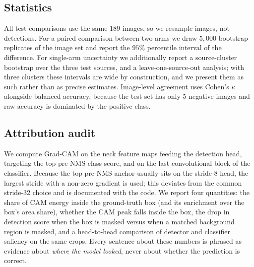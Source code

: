 \subsection{Statistics}

All test comparisons use the same $189$ images, so we resample images, not
detections. For a paired comparison between two arms we draw $5{,}000$ bootstrap
replicates of the image set \citep{efron1993bootstrap} and report the $95\%$
percentile interval of the difference. For single-arm uncertainty we additionally
report a source-cluster bootstrap over the three test sources, and a
leave-one-source-out analysis; with three clusters these intervals are wide by
construction, and we present them as such rather than as precise estimates.
Image-level agreement uses Cohen's $\kappa$ \citep{cohen1960kappa} alongside
balanced accuracy, because the test set has only $5$ negative images and raw
accuracy is dominated by the positive class.

\subsection{Attribution audit}

We compute Grad-CAM \citep{selvaraju2017gradcam} on the neck feature maps feeding
the detection head, targeting the top pre-NMS class score, and on the last
convolutional block of the classifier. Because the top pre-NMS anchor usually
sits on the stride-8 head, the largest stride with a non-zero gradient is used;
this deviates from the common stride-32 choice and is documented with the code.
We report four quantities: the share of CAM energy inside the ground-truth box
(and its enrichment over the box's area share), whether the CAM peak falls inside
the box, the drop in detection score when the box is masked versus when a
matched background region is masked, and a head-to-head comparison of detector
and classifier saliency on the same crops. Every sentence about these numbers is
phrased as evidence about \emph{where the model looked}, never about whether the
prediction is correct.
